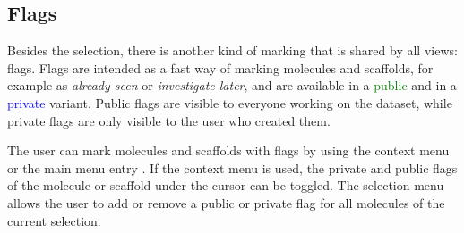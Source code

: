 \subsection{Flags}
\label{sec:linking:flags}

Besides the selection, there is another kind of marking that is shared by all views: flags. Flags are intended as a fast way of marking molecules and scaffolds, for example as \textit{already seen} or \textit{investigate later}, and are available in a \textcolor{green}{public} and in a \textcolor{blue}{private} variant. Public flags are visible to everyone working on the dataset, while private flags are only visible to the user who created them.

The user can mark molecules and scaffolds with flags by using the context menu or the main menu entry .
If the context menu is used, the private and public flags of the molecule or scaffold under the cursor can be toggled.
The selection menu allows the user to add or remove a public or private flag for all molecules of the current selection.
